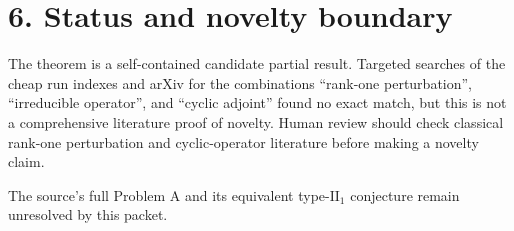\documentclass[11pt]{article}
\begin{document}
\section*{6. Status and novelty boundary}

The theorem is a self-contained candidate partial result.  Targeted searches of the cheap run indexes and arXiv for the combinations ``rank-one perturbation'', ``irreducible operator'', and ``cyclic adjoint'' found no exact match, but this is not a comprehensive literature proof of novelty.  Human review should check classical rank-one perturbation and cyclic-operator literature before making a novelty claim.

The source's full Problem A and its equivalent type-$\mathrm{II}_1$ conjecture remain unresolved by this packet.
\end{document}
